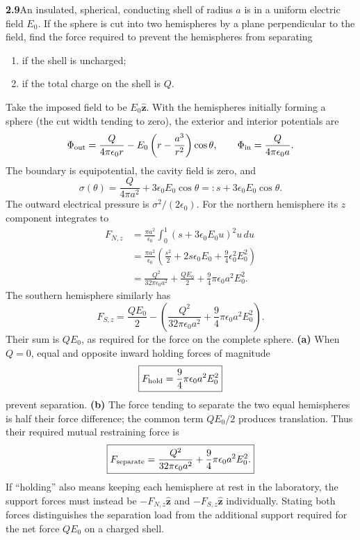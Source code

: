 \par\bigskip
\noindent\textbf{2.9}\quad An insulated, spherical, conducting shell of radius $a$ is in a uniform electric field $E_{0}$. If the sphere is cut into two hemispheres by a plane perpendicular to the field, find the force required to prevent the hemispheres from separating
\begin{enumerate}
\item[(a)] if the shell is uncharged;
\item[(b)] if the total charge on the shell is $Q$.
\end{enumerate}
\solution
Take the imposed field to be $E_0\widehat{\mathbf z}$. With the
hemispheres initially forming a sphere (the cut width tending to zero),
the exterior and interior potentials are
\[
\Phi_{\rm out}=\frac{Q}{4\pi\epsilon _0r}
 -E_0\left(r-\frac{a^3}{r^2}\right)\cos\theta,
\qquad \Phi_{\rm in}=\frac{Q}{4\pi\epsilon _0a}.
\]
The boundary is equipotential, the cavity field is zero, and
\[
\sigma(\theta)=\frac{Q}{4\pi a^2}+3\epsilon _0E_0\cos\theta
=:s+3\epsilon _0E_0\cos\theta.
\]
The outward electrical pressure is $\sigma^2/(2\epsilon _0)$.
For the northern hemisphere its $z$ component integrates to
\begin{align*}
F_{N,z}
&=\frac{\pi a^2}{\epsilon _0}\int_0^1
       (s+3\epsilon _0E_0u)^2u\,du\\
&=\frac{\pi a^2}{\epsilon _0}
 \left(\frac{s^2}{2}+2s\epsilon _0E_0
                    +\frac94\epsilon _0^2E_0^2\right)\\
&=\frac{Q^2}{32\pi\epsilon _0a^2}+\frac{QE_0}{2}
                         +\frac94\pi\epsilon _0a^2E_0^2.
\end{align*}
The southern hemisphere similarly has
\[
F_{S,z}=\frac{QE_0}{2}
 -\left(\frac{Q^2}{32\pi\epsilon _0a^2}
                         +\frac94\pi\epsilon _0a^2E_0^2\right).
\]
Their sum is $QE_0$, as required for the force on the complete sphere.
\textbf{(a)} When $Q=0$, equal and opposite inward holding forces
of magnitude
\[
\boxed{F_{\rm hold}=\frac94\pi\epsilon _0a^2E_0^2}
\]
prevent separation.
\textbf{(b)} The force tending to separate the two equal hemispheres
is half their force difference; the common term $QE_0/2$ produces
translation. Thus their required mutual restraining force is
\[
\boxed{F_{\rm separate}=\frac{Q^2}{32\pi\epsilon _0a^2}
                           +\frac94\pi\epsilon _0a^2E_0^2.}
\]
If ``holding'' also means keeping each hemisphere at rest in the
laboratory, the support forces must instead be
$-F_{N,z}\widehat{\mathbf z}$ and $-F_{S,z}\widehat{\mathbf z}$
individually. Stating both forces distinguishes the separation load
from the additional support required for the net force $QE_0$ on a
charged shell.

